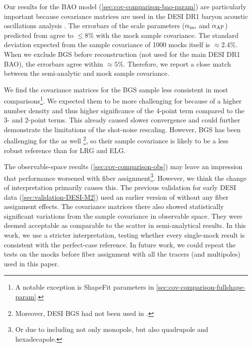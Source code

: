 Our results for the BAO model (\cref{sec:cov-comparison-bao-param}) are particularly important because \rascalc{} covariance matrices are used in the DESI DR1 baryon acoustic oscillations analysis \citep{DESI2024.III.KP4}.
The errorbars of the scale parameters (${\alpha_{\rm iso}}$ and ${\alpha_{\rm AP}}$) predicted from \rascalc{} agree to $\le 8\%$ with the mock sample covariance.
The standard deviation expected from the sample covariance of 1000 mocks itself is $\approx 2.4\%$.
When we exclude BGS before reconstruction (not used for the main DESI DR1 BAO), the errorbars agree within $\approx 5\%$.
Therefore, we report a close match between the semi-analytic and mock sample covariance.

We find the covariance matrices for the BGS sample less consistent in most comparisons\footnote{A notable exception is ShapeFit parameters in \cref{sec:cov-comparison-fullshape-param}.}.
We expected them to be more challenging for \rascalc{} because of a higher number density and thus higher significance of the 4-point term compared to the 3- and 2-point terms.
This already caused slower convergence and could further demonstrate the limitations of the shot-noise rescaling.
However, BGS has been challenging for the \ezmocks{} as well \citep{KP3s8-Zhao}\footnote{Moreover, DESI BGS \ezmocks{} had not been used in \cite{BAO.EDR.Moon.2023}.}, so their sample covariance is likely to be a less robust reference than for LRG and ELG.

The observable-space results (\cref{sec:cov-comparison-obs}) may leave an impression that \rascalc{} performance worsened with fiber assignment\footnote{Or due to including not only monopole, but also quadrupole and hexadecapole.}.
However, we think the change of interpretation primarily causes this.
The previous \rascalc{} validation for early DESI data (\cref{sec:validation-DESI-M2}) used an earlier version of \ezmocks{} without any fiber assignment effects.
The covariance matrices there also showed statistically significant variations from the sample covariance in observable space.
They were deemed acceptable as comparable to the scatter in semi-analytical results.
In this work, we use a stricter interpretation, testing whether every \rascalc{} single-mock result is consistent with the perfect-case reference.
In future work, we could repeat the tests on the mocks before fiber assignment with all the tracers (and multipoles) used in this paper.

